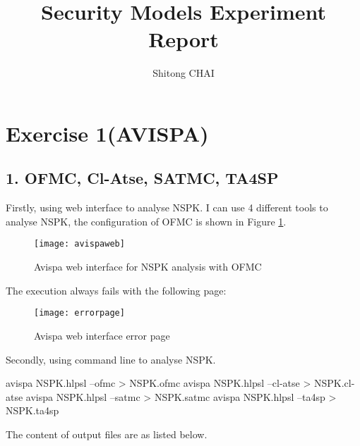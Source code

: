 \documentclass[a4paper, 12pt]{report}
\title{Security Models Experiment Report}
\date{}
\author{Shitong CHAI}
\begin{document}
\maketitle
\tableofcontents

\chapter* {Exercise 1(AVISPA)}
%
    \section*{1. OFMC, Cl-Atse, SATMC, TA4SP}
    Firstly, using web interface to analyse NSPK. I can use 4 different tools to analyse NSPK, the configuration of OFMC is shown in Figure \ref{avispaweb}.
    \begin{figure}[H]
        \centering
        \texttt{[image: avispaweb]}
        \caption{Avispa web interface for NSPK analysis with OFMC}
        \label{avispaweb}
    \end{figure}

    The execution always fails with the following page:

    \begin{figure}[H]
        \centering
        \texttt{[image: errorpage]}
        \caption{Avispa web interface error page}
        \label{errorpage}
    \end{figure}

    Secondly, using command line to analyse NSPK.
        \begin{commandshell}
avispa NSPK.hlpsl --ofmc > NSPK.ofmc
avispa NSPK.hlpsl --cl-atse > NSPK.cl-atse
avispa NSPK.hlpsl --satmc > NSPK.satmc
avispa NSPK.hlpsl --ta4sp > NSPK.ta4sp
        \end{commandshell}
        The content of output files are as listed below.
\end{document}
